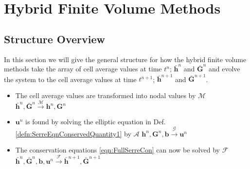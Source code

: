 
\chapter{Hybrid Finite Volume Methods}
\label{chp:HFVMMethod}







\section{Structure Overview}


In this section we will give the general structure for how the hybrid finite volume methods take the array of cell average values at time $t^n$; $\bar{\boldsymbol{h}}^n$ and $\bar{\boldsymbol{G}}^n$ and evolve the system to the cell average values at time $t^{n+1}$; $\bar{\boldsymbol{h}}^{n+ 1}$ and $\bar{\boldsymbol{G}}^{n+ 1}$.

\begin{itemize}
	\item The cell average values are transformed into nodal values by $\mathcal{M}$
		\newline  \centering $\bar{\boldsymbol{h}}^n, \bar{\boldsymbol{G}}^n  \xrightarrow{\mathcal{M}}  \boldsymbol{h}^n, \boldsymbol{G}^n  $ 
    \item $\boldsymbol{u}^n$ is found by solving the elliptic equation in Def. \ref{defn:SerreEqnConservedQuantity1} by $\mathcal{A}$
   		\newline   \centering ${\boldsymbol{h}}^n, {\boldsymbol{G}}^n , {\boldsymbol{b}}  \xrightarrow{\mathcal{\mathcal{G}}}  \boldsymbol{u}^n  $
	\item The conservation equations \eqref{eqn:FullSerreCon} can now be solved by $\mathcal{F}$ 
		\newline   \centering $\bar{\boldsymbol{h}}^n, \bar{\boldsymbol{G}}^n, {\boldsymbol{b}}, {\boldsymbol{u}}^n  \xrightarrow{\mathcal{\mathcal{F}}}  \bar{\boldsymbol{h}}^{n+ 1}, \bar{\boldsymbol{G}}^{n+ 1}  $
\end{itemize}

